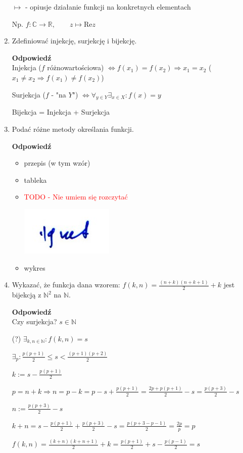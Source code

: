 \documentclass[12pt,a4paper]{article}
\theoremstyle{break}
\newcommand{\Odp}[1]{
		\begin{mdframed}[style=zadanie]
			\textbf{Odpowiedź}\\
			#1
		\end{mdframed}
	}
\begin{document}
\begin{enumerate}[1.]
{		$\longmapsto$ - opiusje działanie funkcji na konkretnych elementach
		
		Np. $f:\mathbb{C} \longrightarrow \mathbb{R}, \qquad z\longmapsto \text{Re}z$
	}
	
	\item Zdefiniować injekcję, surjekcję i bijekcję.
	\Odp{
		Injekcja ($f$ różnowartościowa) $\Leftrightarrow f(x_1)=f(x_2)\Rightarrow x_1=x_2$ ($x_1\neq x_2 \Rightarrow f(x_1)\neq f(x_2)$)
		
		Surjekcja ($f$ - "na $Y$") $\Leftrightarrow \forall_{y\in Y} \exists_{x\in X} : f(x)=y$
		
		Bijekcja = Injekcja + Surjekcja
	}
	
	\item Podać różne metody określania funkcji.
	\Odp{
		\begin{itemize}
			\item przepis (w tym wzór)
			\item tableka
			\item \textcolor{red}{TODO - Nie umiem się rozczytać}
			
			\includegraphics{help.jpeg}
			
			\item wykres
		\end{itemize}
	}
	
	\item Wykazać, że funkcja dana wzorem: $f (k, n) = \frac{(n+k)(n+k+1)}{2}+k$ jest bijekcją z $\mathbb{N}^2$ na $\mathbb{N}$.
	\Odp{
		Czy surjekcja? $s\in \mathbb{N}$
		
		(?) $\exists_{k,n\in\mathbb{N}}: f(k,n)=s$
		
		$\exists_p: \frac{p(p+1)}{2}\leq s < \frac{(p+1)(p+2)}{2}$
		
		$k:=s-\frac{p(p+1)}{2}$ 
		
		$p=n+k\Rightarrow n=p-k = p-s+\frac{p(p+1)}{2}=\frac{2p+p(p+1)}{2}-s=\frac{p(p+3)}{2}-s$
		
		$n:=\frac{p(p+3)}{2}-s$
	
		$k+n=s-\frac{p(p+1)}{2}+\frac{p(p+3)}{2}-s=\frac{p(p+3-p-1)}{2}=\frac{2p}{p}=p$
		
		$f(k,n)=\frac{(k+n)(k+n+1)}{2}+k=\frac{p(p+1)}{2}+s-\frac{p(p-1)}{2}=s$\\\\
		
}
\end{enumerate}
\end{document}
